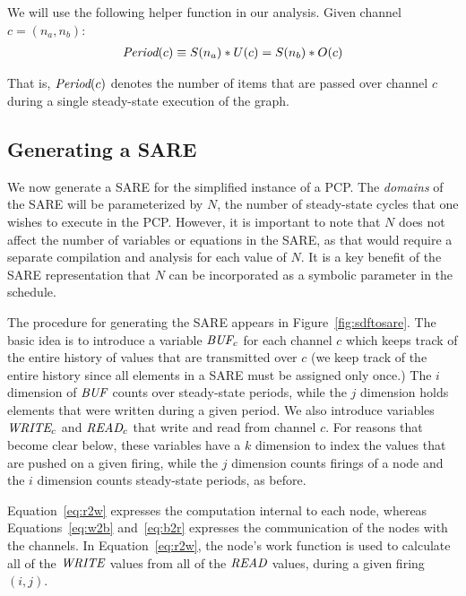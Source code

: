 We will use the following helper function in our analysis.  Given
channel $c = (n_a, n_b)$:
\begin{align*}
\mbox{\it Period}(c) \equiv S(n_a) * U(c) = S(n_b) * O(c)
\end{align*}

That is, $\mbox{\it Period}(c)$ denotes the number of items that are passed
over channel $c$ during a single steady-state execution of the graph.

\subsection{Generating a SARE}
\label{sec:simplesare}

We now generate a SARE for the simplified instance of a PCP.  The {\it
domains} of the SARE will be parameterized by $N$, the number of
steady-state cycles that one wishes to execute in the PCP.  However,
it is important to note that $N$ does not affect the number of
variables or equations in the SARE, as that would require a separate
compilation and analysis for each value of $N$.  It is a key benefit
of the SARE representation that $N$ can be incorporated as a symbolic
parameter in the schedule.



The procedure for generating the SARE appears in
Figure~\ref{fig:sdftosare}.  The basic idea is to introduce a variable
$\mbox{\it BUF}_c$ for each channel $c$ which keeps track of the entire
history of values that are transmitted over $c$ (we keep track of the
entire history since all elements in a SARE must be assigned only
once.)  The $i$ dimension of $\mbox{\it BUF}$ counts over steady-state
periods, while the $j$ dimension holds elements that were written
during a given period.  We also introduce variables $\mbox{\it WRITE}_c$ and
$\mbox{\it READ}_c$ that write and read from channel $c$.  For reasons that
become clear below, these variables have a $k$ dimension to index the
values that are pushed on a given firing, while the $j$ dimension
counts firings of a node and the $i$ dimension counts steady-state
periods, as before.

Equation~\ref{eq:r2w} expresses the computation internal to each node,
whereas Equations~\ref{eq:w2b} and~\ref{eq:b2r} expresses the
communication of the nodes with the channels.  In
Equation~\ref{eq:r2w}, the node's work function is used to calculate
all of the $\mbox{\it WRITE}$ values from all of the $\mbox{\it READ}$ values,
during a given firing $(i,j)$. 

